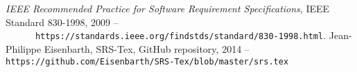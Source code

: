 
\begingroup
\renewcommand{\chapter}[2]{}%

\begin{thebibliography}{1}
    \textit{IEEE Recommended Practice for Software Requirement
      Specifications}, IEEE Standard 830-1998, 2009 -- \nolinkurl{
      https://standards.ieee.org/findstds/standard/830-1998.html}.
    Jean-Philippe Eisenbarth, SRS-Tex, GitHub repository, 2014 -- 
      \nolinkurl{https://github.com/Eisenbarth/SRS-Tex/blob/master/srs.tex}
\end{thebibliography}

\endgroup
